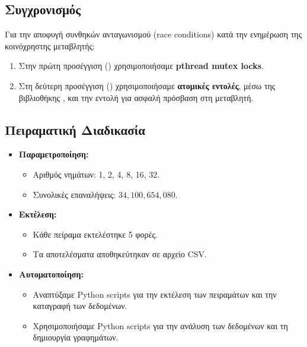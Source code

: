 \documentclass{article}
\begin{document}
\subsection*{Συγχρονισμός}
Για την αποφυγή συνθηκών ανταγωνισμού (race conditions) κατά την ενημέρωση της κοινόχρηστης μεταβλητής:
\begin{enumerate}
    \item Στην πρώτη προσέγγιση () χρησιμοποιήσαμε \textbf{pthread mutex locks}.
    \item Στη δεύτερη προσέγγιση () χρησιμοποιήσαμε \textbf{ατομικές εντολές}, μέσω της βιβλιοθήκης , και την εντολή  για ασφαλή πρόσβαση στη μεταβλητή.
\end{enumerate}

\subsection*{Πειραματική Διαδικασία}
\begin{itemize} 
    \item \textbf{Παραμετροποίηση:} 
    \begin{itemize} 
        \item Αριθμός νημάτων: 1, 2, 4, 8, 16, 32. 
        \item Συνολικές επαναλήψεις: $34,100,654,080$. 
    \end{itemize} 
    \item \textbf{Εκτέλεση:} 
    \begin{itemize} 
        \item Κάθε πείραμα εκτελέστηκε 5 φορές. 
        \item Τα αποτελέσματα αποθηκεύτηκαν σε αρχείο CSV. 
    \end{itemize} 
    \item \textbf{Αυτοματοποίηση:} 
    \begin{itemize} 
        \item Αναπτύξαμε Python scripts για την εκτέλεση των πειραμάτων και την καταγραφή των δεδομένων.
        \item Χρησιμοποιήσαμε Python scripts για την ανάλυση των δεδομένων και τη δημιουργία γραφημάτων.
    \end{itemize} 
\end{itemize}
\end{document}

